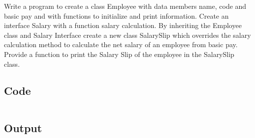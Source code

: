 \documentclass[../main.tex]{subfiles}
\begin{document}
Write a program to create a class Employee with data members name, code and
basic pay and with functions to initialize and print information. Create an
interface Salary with a function salary calculation. By inheriting the Employee
class and Salary Interface create a new class SalarySlip which overrides the
salary calculation method to calculate the net salary of an employee from basic
pay. Provide a function to print the Salary Slip of the employee in the
SalarySlip class.

\subsection{Code}
\inputminted[frame=lines, breaklines, breakanywhere, numberblanklines=false]{java}{./programs/prog8/SallarySlip.java}

\subsection{Output}
\end{document}
